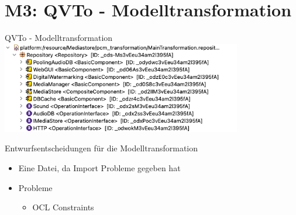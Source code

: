 \section[M3: QVTo]{M3: QVTo - Modelltransformation}
\begin{frame}{QVTo - Modelltransformation}
	\centering
	\includegraphics[height=40mm]{figures/qvto.png}
\end{frame}

\begin{frame}{Entwurfsentscheidungen für die Modelltransformation}
	\begin{itemize}
		\item Eine Datei, da Import Probleme gegeben hat
		\item Probleme
		\begin{itemize}
            \item OCL Constraints
        \end{itemize}
	\end{itemize}
\end{frame}